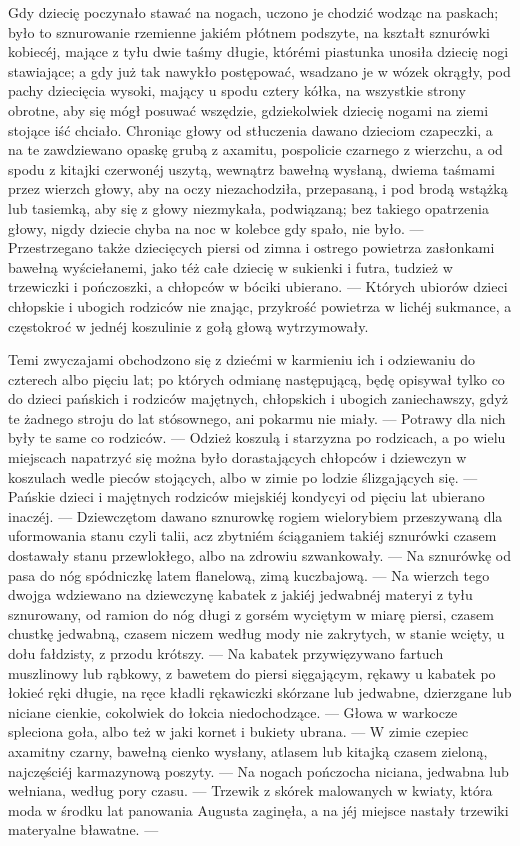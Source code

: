 \documentclass{book}
\begin{document}
Gdy dziecię poczynało stawać na nogach, uczono je chodzić wodząc na paskach; było to sznurowanie rzemienne jakiém płótnem podszyte, na kształt sznurówki kobiecéj, mające z tyłu dwie taśmy długie, którémi piastunka unosiła dziecię nogi stawiające; a gdy już tak nawykło postępować, wsadzano je w wózek okrągły, pod pachy dziecięcia wysoki, mający u spodu cztery kółka, na wszystkie strony obrotne, aby się mógł posuwać wszędzie, gdziekolwiek dziecię nogami na ziemi stojące iść chciało. Chroniąc głowy od stłuczenia dawano dzieciom czapeczki, a na te zawdziewano opaskę grubą z axamitu, pospolicie czarnego z wierzchu, a od spodu z kitajki czerwonéj uszytą, wewnątrz bawełną wysłaną, dwiema taśmami przez wierzch głowy, aby na oczy niezachodziła, przepasaną, i pod brodą wstążką lub tasiemką, aby się z głowy niezmykała, podwiązaną; bez takiego opatrzenia głowy, nigdy dziecie chyba na noc w kolebce gdy spało, nie było. — Przestrzegano także dziecięcych piersi od zimna i ostrego powietrza zasłonkami bawełną wyściełanemi, jako téż całe dziecię w sukienki i futra, tudzież w trzewiczki i pończoszki, a chłopców w bóciki ubierano. — Których ubiorów dzieci chłopskie i ubogich rodziców nie znając, przykrość powietrza w lichéj sukmance, a częstokroć w jednéj koszulinie z gołą głową wytrzymowały.



Temi zwyczajami obchodzono się z dziećmi w karmieniu ich i odziewaniu do czterech albo pięciu lat; po których odmianę następującą, będę opisywał tylko co do dzieci pańskich i rodziców majętnych, chłopskich i ubogich zaniechawszy, gdyż te żadnego stroju do lat stósownego, ani pokarmu nie miały. — Potrawy dla nich były te same co rodziców. — Odzież koszulą i starzyzna po rodzicach, a po wielu miejscach napatrzyć się można było dorastających chłopców i dziewczyn w koszulach wedle pieców stojących, albo w zimie po lodzie ślizgających się. — Pańskie dzieci i majętnych rodziców miejskiéj kondycyi od pięciu lat ubierano inaczéj. — Dziewczętom dawano sznurowkę rogiem wielorybiem przeszywaną dla uformowania stanu czyli talii, acz zbytniém ściąganiem takiéj sznurówki czasem dostawały stanu przewlokłego, albo na zdrowiu szwankowały. — Na sznurówkę od pasa do nóg spódniczkę latem flanelową, zimą kuczbajową. — Na wierzch tego dwojga wdziewano na dziewczynę kabatek z jakiéj jedwabnéj materyi z tyłu sznurowany, od ramion do nóg długi z gorsém wyciętym w miarę piersi, czasem chustkę jedwabną, czasem niczem według mody nie zakrytych, w stanie wcięty, u dołu fałdzisty, z przodu krótszy. — Na kabatek przywięzywano fartuch muszlinowy lub rąbkowy, z bawetem do piersi sięgającym, rękawy u kabatek po łokieć ręki długie, na ręce kładli rękawiczki skórzane lub jedwabne, dzierzgane lub niciane cienkie, cokolwiek do łokcia niedochodzące. — Głowa w warkocze spleciona goła, albo też w jaki kornet i bukiety ubrana. — W zimie czepiec axamitny czarny, bawełną cienko wysłany, atlasem lub kitajką czasem zieloną, najczęściéj karmazynową poszyty. — Na nogach pończocha niciana, jedwabna lub wełniana, według pory czasu. — Trzewik z skórek malowanych w kwiaty, która moda w środku lat panowania Augusta zaginęła, a na jéj miejsce nastały trzewiki materyalne bławatne. —
\end{document}
